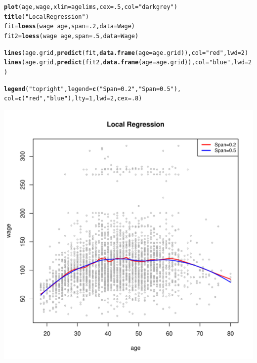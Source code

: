 \documentclass[12pt]{article}\usepackage[]{graphicx}\usepackage[]{color}
\makeatletter
\def\maxwidth{ %
  \ifdim\Gin@nat@width>\linewidth
    \linewidth
  \else
    \Gin@nat@width
  \fi
}
\newcommand{\hlnum}[1]{\textcolor[rgb]{0.686,0.059,0.569}{#1}}%
\newcommand{\hlstr}[1]{\textcolor[rgb]{0.192,0.494,0.8}{#1}}%
\newcommand{\hlopt}[1]{\textcolor[rgb]{0,0,0}{#1}}%
\newcommand{\hlstd}[1]{\textcolor[rgb]{0.345,0.345,0.345}{#1}}%
\newcommand{\hlkwb}[1]{\textcolor[rgb]{0.69,0.353,0.396}{#1}}%
\newcommand{\hlkwc}[1]{\textcolor[rgb]{0.333,0.667,0.333}{#1}}%
\newcommand{\hlkwd}[1]{\textcolor[rgb]{0.737,0.353,0.396}{\textbf{#1}}}%
\newenvironment{kframe}{%
 \def\at@end@of@kframe{}%
 \ifinner\ifhmode%
  \def\at@end@of@kframe{\end{minipage}}%
  \begin{minipage}{\columnwidth}%
 \fi\fi%
 \def\FrameCommand##1{\hskip\@totalleftmargin \hskip-\fboxsep
 \colorbox{shadecolor}{##1}\hskip-\fboxsep
     \hskip-\linewidth \hskip-\@totalleftmargin \hskip\columnwidth}%
 \MakeFramed {\advance\hsize-\width
   \@totalleftmargin\z@ \linewidth\hsize
   \@setminipage}}%
 {\par\unskip\endMakeFramed%
 \at@end@of@kframe}
\newenvironment{knitrout}{}{} %
\makeatother
\begin{document}
\begin{knitrout}
\color{fgcolor}\begin{kframe}
\begin{alltt}
\hlkwd{plot}\hlstd{(age, wage,} \hlkwc{xlim}\hlstd{=agelims,} \hlkwc{cex}\hlstd{=}\hlnum{.5}\hlstd{,} \hlkwc{col}\hlstd{=}\hlstr{"darkgrey"}\hlstd{)}
\hlkwd{title}\hlstd{(}\hlstr{"Local Regression"}\hlstd{)}
\hlstd{fit}\hlkwb{=}\hlkwd{loess}\hlstd{(wage}\hlopt{~}\hlstd{age,} \hlkwc{span}\hlstd{=}\hlnum{.2}\hlstd{,} \hlkwc{data}\hlstd{=Wage)}
\hlstd{fit2}\hlkwb{=}\hlkwd{loess}\hlstd{(wage}\hlopt{~}\hlstd{age,} \hlkwc{span}\hlstd{=}\hlnum{.5}\hlstd{,} \hlkwc{data}\hlstd{=Wage)}

\hlkwd{lines}\hlstd{(age.grid,} \hlkwd{predict}\hlstd{(fit,} \hlkwd{data.frame}\hlstd{(}\hlkwc{age}\hlstd{=age.grid)),} \hlkwc{col}\hlstd{=}\hlstr{"red"}\hlstd{,} \hlkwc{lwd}\hlstd{=}\hlnum{2}\hlstd{)}
\hlkwd{lines}\hlstd{(age.grid,} \hlkwd{predict}\hlstd{(fit2,}\hlkwd{data.frame}\hlstd{(}\hlkwc{age}\hlstd{=age.grid)),} \hlkwc{col}\hlstd{=}\hlstr{"blue"}\hlstd{,} \hlkwc{lwd}\hlstd{=}\hlnum{2}\hlstd{)}

\hlkwd{legend}\hlstd{(}\hlstr{"topright"}\hlstd{,} \hlkwc{legend}\hlstd{=}\hlkwd{c}\hlstd{(}\hlstr{"Span=0.2"}\hlstd{,} \hlstr{"Span=0.5"}\hlstd{),}
       \hlkwc{col}\hlstd{=}\hlkwd{c}\hlstd{(}\hlstr{"red"}\hlstd{,}\hlstr{"blue"}\hlstd{),} \hlkwc{lty}\hlstd{=}\hlnum{1}\hlstd{,} \hlkwc{lwd}\hlstd{=}\hlnum{2}\hlstd{,} \hlkwc{cex}\hlstd{=}\hlnum{.8}\hlstd{)}
\end{alltt}
\end{kframe}
\includegraphics[width=\maxwidth]{figure/unnamed-chunk-22-1} 

\end{knitrout}
\end{document}
